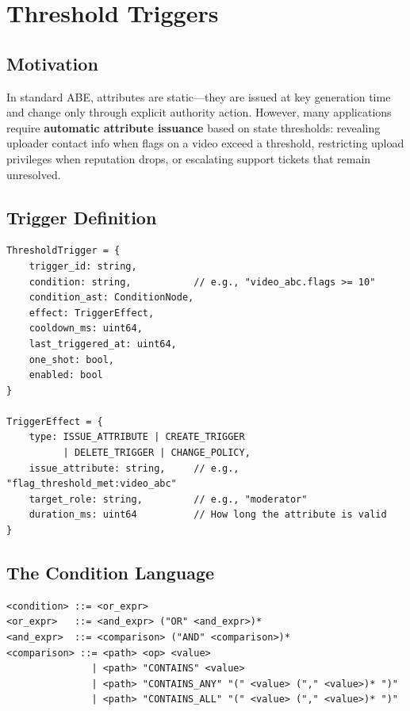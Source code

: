 \documentclass[11pt,a4paper]{article}
\begin{document}
\section{Threshold Triggers}

\subsection{Motivation}

In standard ABE, attributes are static---they are issued at key generation time and change only through explicit authority action. However, many applications require \textbf{automatic attribute issuance} based on state thresholds: revealing uploader contact info when flags on a video exceed a threshold, restricting upload privileges when reputation drops, or escalating support tickets that remain unresolved.

\subsection{Trigger Definition}

\begin{lstlisting}
ThresholdTrigger = {
    trigger_id: string,
    condition: string,           // e.g., "video_abc.flags >= 10"
    condition_ast: ConditionNode,
    effect: TriggerEffect,
    cooldown_ms: uint64,
    last_triggered_at: uint64,
    one_shot: bool,
    enabled: bool
}

TriggerEffect = {
    type: ISSUE_ATTRIBUTE | CREATE_TRIGGER
          | DELETE_TRIGGER | CHANGE_POLICY,
    issue_attribute: string,     // e.g., "flag_threshold_met:video_abc"
    target_role: string,         // e.g., "moderator"
    duration_ms: uint64          // How long the attribute is valid
}
\end{lstlisting}

\subsection{The Condition Language}

\begin{lstlisting}
<condition> ::= <or_expr>
<or_expr>   ::= <and_expr> ("OR" <and_expr>)*
<and_expr>  ::= <comparison> ("AND" <comparison>)*
<comparison> ::= <path> <op> <value>
               | <path> "CONTAINS" <value>
               | <path> "CONTAINS_ANY" "(" <value> ("," <value>)* ")"
               | <path> "CONTAINS_ALL" "(" <value> ("," <value>)* ")"
\end{lstlisting}
\end{document}
